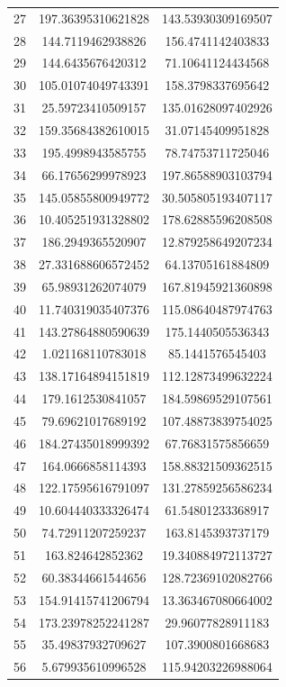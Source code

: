 \documentclass[a4paper,12pt,twoside,openany]{report}
\begin{document}
\begin{longtable}{*{3}{c}}
27	& 197.36395310621828	& 143.53930309169507	\\
28	& 144.7119462938826	& 156.4741142403833	\\
29	& 144.6435676420312	& 71.10641124434568	\\
30	& 105.01074049743391	& 158.3798337695642	\\
31	& 25.59723410509157	& 135.01628097402926	\\
32	& 159.35684382610015	& 31.07145409951828	\\
33	& 195.4998943585755	& 78.74753711725046	\\
34	& 66.17656299978923	& 197.86588903103794	\\
35	& 145.05855800949772	& 30.505805193407117	\\
36	& 10.405251931328802	& 178.62885596208508	\\
37	& 186.2949365520907	& 12.879258649207234	\\
38	& 27.331688606572452	& 64.13705161884809	\\
39	& 65.98931262074079	& 167.81945921360898	\\
40	& 11.740319035407376	& 115.08640487974763	\\
41	& 143.27864880590639	& 175.1440505536343	\\
42	& 1.021168110783018	& 85.1441576545403	\\
43	& 138.17164894151819	& 112.12873499632224	\\
44	& 179.1612530841057	& 184.59869529107561	\\
45	& 79.69621017689192	& 107.48873839754025	\\
46	& 184.27435018999392	& 67.76831575856659	\\
47	& 164.0666858114393	& 158.88321509362515	\\
48	& 122.17595616791097	& 131.27859256586234	\\
49	& 10.604440333326474	& 61.54801233368917	\\
50	& 74.72911207259237	& 163.8145393737179	\\
51	& 163.824642852362	& 19.340884972113727	\\
52	& 60.38344661544656	& 128.72369102082766	\\
53	& 154.91415741206794	& 13.363467080664002	\\
54	& 173.23978252241287	& 29.96077828911183	\\
55	& 35.49837932709627	& 107.3900801668683	\\
56	& 5.679935610996528	& 115.94203226988064	\\

\end{longtable}
\end{document}
